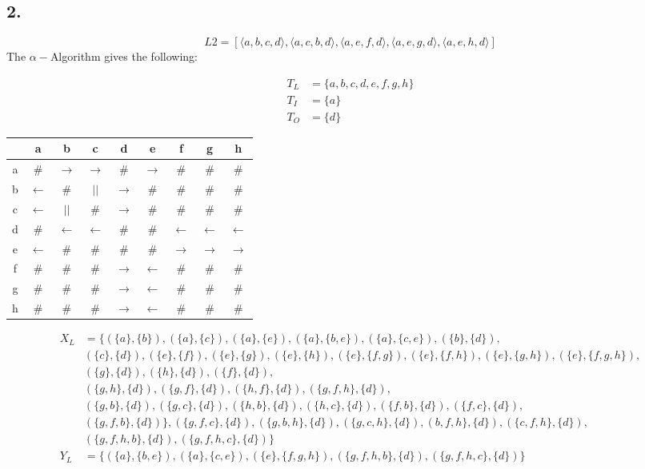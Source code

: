 \subsection*{2.}
\begin{equation*}
L2= [\langle a,b,c,d\rangle ,\langle a,c,b,d\rangle,\langle a,e,f,d\rangle
,\langle a,e,g,d\rangle ,\langle a,e,h,d\rangle]
\end{equation*}
The $\alpha-$Algorithm gives the following:

\begin{align*}
T_L &= \{ a,b,c,d,e,f,g,h\}\\
T_I &= \{a\}\\
T_O &= \{d\}
\end{align*}
\begin{tabular}{c | c c c c c c c c}
	&a 	  		  &b 			 &c 			&d 	  			&e 			   &f			&g			&h\\
	\hline
a	&$\#$ 		  &$\rightarrow$ &$\rightarrow$	&$\#$ 			&$\rightarrow$ &$\#$		&$\#$
   	&$\#$\\
b	&$\leftarrow$ &$\#$			 &$||$ 			&$\rightarrow$	&$\#$ 		   &$\#$		&$\#$	
	&$\#$\\
c	&$\leftarrow$ &$||$			 &$\#$			&$\rightarrow$  &$\#$ 		   &$\#$		&$\#$	
	&$\#$\\
d	&$\#$ 		  &$\leftarrow$  &$\leftarrow$	&$\#$			&$\#$ 		   &$\leftarrow$
	&$\leftarrow$ &$\leftarrow$\\
e	&$\leftarrow$ &$\#$ 		 &$\#$			&$\#$  			&$\#$		   &$\rightarrow$
	&$\rightarrow$	&$\rightarrow$\\
f	&$\#$ 		  &$\#$			 &$\#$			&$\rightarrow$	&$\leftarrow$  &$\#$		&$\#$     
&$\#$\\
g	&$\#$ 		  &$\#$			 &$\#$			&$\rightarrow$	&$\leftarrow$  &$\#$		&$\#$     
&$\#$\\
h	&$\#$ 		  &$\#$			 &$\#$			&$\rightarrow$	&$\leftarrow$  &$\#$		&$\#$     
&$\#$\\
\end{tabular}

\begin{align*}
X_L &= \{ (\{a\},\{b\}),(\{a\},\{c\})
,(\{a\},\{e\}),(\{a\},\{b,e\}),(\{a\},\{c,e\}),(\{b\},\{d\}),\\
&(\{c\},\{d\}),(\{e\},\{f\}),(\{e\},\{g\}),(\{e\},\{h\}),(\{e\},\{f,g\}),(\{e\},\{f,h\}),(\{e\},\{g,h\}),(\{e\},\{f,g,h\}),\\
&(\{g\},\{d\}),(\{h\},\{d\}),(\{f\},\{d\}),\\
&(\{g,h\},\{d\}),(\{g,f\},\{d\}),(\{h,f\},\{d\}),(\{g,f,h\},\{d\}),\\
&(\{g,b\},\{d\}),(\{g,c\},\{d\}),(\{h,b\},\{d\}),(\{h,c\},\{d\}),(\{f,b\},\{d\}),(\{f,c\},\{d\}),\\
&(\{g,f,b\},\{d\})\},(\{g,f,c\},\{d\}),(\{g,b,h\},\{d\}),(\{g,c,h\},\{d\}),(b,f,h\},\{d\}),(\{c,f,h\},\{d\}),\\
&(\{g,f,h,b\},\{d\}),(\{g,f,h,c\},\{d\})\}\\
Y_L &=
\{(\{a\},\{b,e\}),(\{a\},\{c,e\}),(\{e\},\{f,g,h\}),(\{g,f,h,b\},\{d\}),(\{g,f,h,c\},\{d\})\}\\
\end{align*}

